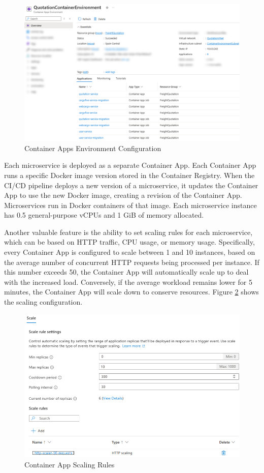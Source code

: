 \documentclass[12pt, reqno, oneside]{amsbook}
\theoremstyle{definition}
\theoremstyle{definition}
\numberwithin{section}{chapter}
\numberwithin{table}{chapter}
\numberwithin{figure}{chapter}
\begin{document}
\begin{figure}[H]
  \centering
  \includegraphics[width=1\linewidth]{images/ContainerAppsEnvironment.png}
  \caption{\label{Figure:ContainerAppsEnvironment}Container Apps Environment Configuration}
\end{figure}

Each microservice is deployed as a separate Container App. Each Container App runs a specific Docker image version stored in the Container Registry. When the \ac{CI/CD} pipeline deploys a new version of a microservice, it updates the Container App to use the new Docker image, creating a revision of the Container App. Microservices run in Docker containers of that image. Each microservice instance has 0.5 general-purpose \acp{vCPU} and 1 \ac{GiB} of memory allocated.

Another valuable feature is the ability to set scaling rules for each microservice, which can be based on \ac{HTTP} traffic, \ac{CPU} usage, or memory usage. Specifically, every Container App is configured to scale between 1 and 10 instances, based on the average number of concurrent \ac{HTTP} requests being processed per instance. If this number exceeds 50, the Container App will automatically scale up to deal with the increased load. Conversely, if the average workload remains lower for 5 minutes, the Container App will scale down to conserve resources. Figure \ref{Figure:ContainerAppsScaling} shows the scaling configuration.

\begin{figure}[H]
  \centering
  \includegraphics[width=0.9\linewidth]{images/ContainerAppsScaling.png}
  \caption{\label{Figure:ContainerAppsScaling}Container App Scaling Rules}
\end{figure}
\end{document}
